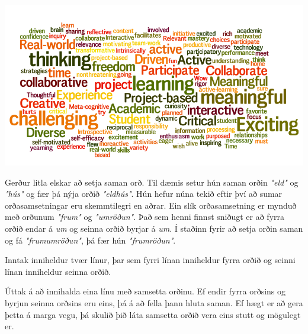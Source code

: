 
\includegraphics[scale=0.4]{words.png}

Gerður litla elskar að setja saman orð. Til dæmis setur hún saman orðin
\textit{"eld"} og \textit{"hús"} og fær þá nýja orðið
\textit{"eldhús"}. Hún hefur núna tekið eftir því að sumar
orðasamsetningar eru skemmtilegri en aðrar. Ein slík orðasamsetning er mynduð
með orðunum \textit{"frum"} og \textit{"umröðun"}. Það sem henni
finnst sniðugt er að fyrra orðið endar á \textit{um} og seinna orðið byrjar á \textit{um}. Í
staðinn fyrir að setja orðin saman og fá \textit{"frumumröðun"}, þá fær
hún \textit{"frumröðun"}.

Inntak inniheldur tvær línur, þar sem fyrri línan inniheldur fyrra orðið og
seinni línan inniheldur seinna orðið.

Úttak á að innihalda eina línu með samsetta orðinu. Ef endir fyrra orðsins og
byrjun seinna orðsins eru eins, þá á að fella þann hluta saman. Ef hægt er að
gera þetta á marga vegu, þá skulið þið láta samsetta orðið vera eins stutt og
mögulegt er.


